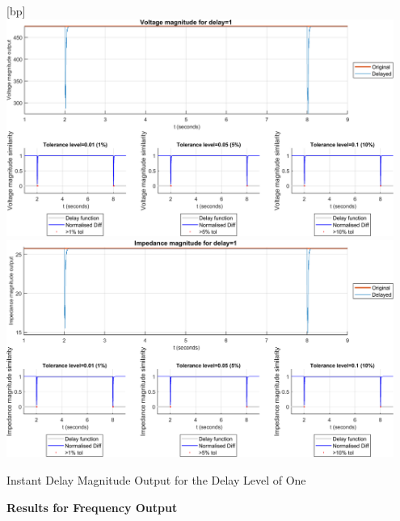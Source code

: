 \begin{floatingfigure}[p]{\textwidth}[bp]
    \includegraphics[width=0.95\textwidth]{PMUsim-figures/DelayOf_1/Instant_vMagnitude.png}    
      \includegraphics[width=0.95\textwidth]{PMUsim-figures/DelayOf_1/Instant_iMagnitude.png}      
    \label{fig:PMUsim_One_Magnitude}
    \caption{Instant Delay Magnitude Output for the Delay Level of One}
\end{floatingfigure}

\newpage \textbf{Results for Frequency Output}


